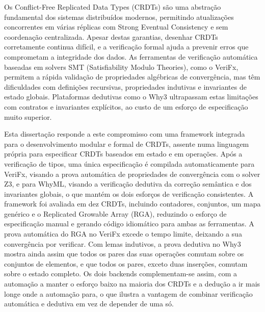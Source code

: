
%

Os Conflict-Free Replicated Data Types (CRDTs) são uma abstração fundamental dos sistemas distribuídos modernos, permitindo
atualizações concorrentes em várias réplicas com Strong Eventual Consistency e sem coordenação centralizada. Apesar destas
garantias, desenhar CRDTs corretamente continua difícil, e a verificação formal ajuda a prevenir erros que comprometam a
integridade dos dados. As ferramentas de verificação automática baseadas em solvers SMT (Satisfiability Modulo Theories),
como o VeriFx, permitem a rápida validação de propriedades algébricas de convergência, mas têm dificuldades com definições
recursivas, propriedades indutivas e invariantes de estado globais. Plataformas dedutivas como o Why3 ultrapassam estas
limitações com contratos e invariantes explícitos, ao custo de um esforço de especificação muito superior.

Esta dissertação responde a este compromisso com uma framework integrada para o desenvolvimento modular e formal de CRDTs,
assente numa linguagem própria para especificar CRDTs baseados em estado e em operações. Após a verificação de tipos, uma
única especificação é compilada automaticamente para VeriFx, visando a prova automática de propriedades de convergência
com o solver Z3, e para WhyML, visando a verificação dedutiva da correção semântica e dos invariantes globais, o que mantém
os dois esforços de verificação consistentes. A framework foi avaliada em dez CRDTs, incluindo contadores, conjuntos, um
mapa genérico e o Replicated Growable Array (RGA), reduzindo o esforço de especificação manual e gerando código idiomático
para ambas as ferramentas. A prova automática do RGA no VeriFx excede o tempo limite, deixando a sua convergência por
verificar. Com lemas indutivos, a prova dedutiva no Why3 mostra ainda assim que todos os pares das suas operações comutam
sobre os conjuntos de elementos, e que todos os pares, exceto duas inserções, comutam sobre o estado completo. Os dois
backends complementam-se assim, com a automação a manter o esforço baixo na maioria dos CRDTs e a dedução a ir mais longe
onde a automação para, o que ilustra a vantagem de combinar verificação automática e dedutiva em vez de depender de uma só.

%
%

